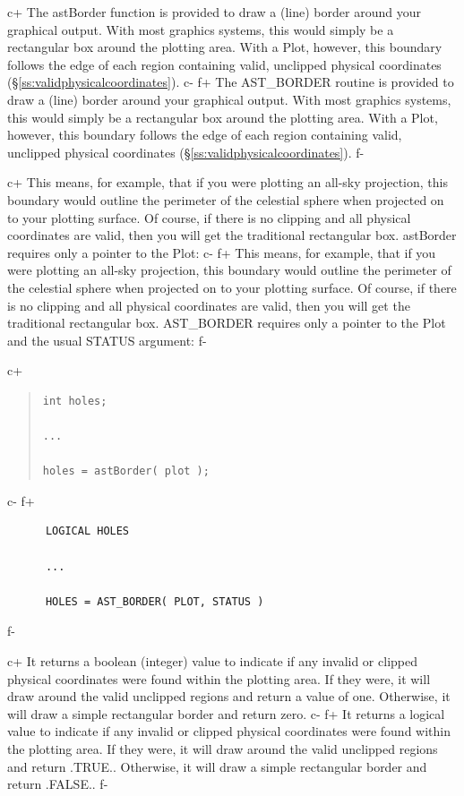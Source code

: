 \documentclass[twoside,11pt]{article}
\newcommand{\secref}[1]{\S\ref{#1}}
\newcommand{\secref}[1]{\ref{#1}}
\begin{document}
c+
The astBorder function is provided to draw a (line) border around your
graphical output. With most graphics systems, this would simply be a
rectangular box around the plotting area. With a Plot, however, this
boundary follows the edge of each region containing valid, unclipped
physical coordinates (\secref{ss:validphysicalcoordinates}).
c-
f+
The AST\_BORDER routine is provided to draw a (line) border around
your graphical output. With most graphics systems, this would simply
be a rectangular box around the plotting area. With a Plot, however,
this boundary follows the edge of each region containing valid,
unclipped physical coordinates (\secref{ss:validphysicalcoordinates}).
f-

c+
This means, for example, that if you were plotting an all-sky
projection, this boundary would outline the perimeter of the celestial
sphere when projected on to your plotting surface. Of course, if there
is no clipping and all physical coordinates are valid, then you will
get the traditional rectangular box. astBorder requires only
a pointer to the Plot:
c-
f+
This means, for example, that if you were plotting an all-sky
projection, this boundary would outline the perimeter of the celestial
sphere when projected on to your plotting surface. Of course, if there
is no clipping and all physical coordinates are valid, then you will
get the traditional rectangular box. AST\_BORDER requires only a
pointer to the Plot and the usual STATUS argument:
f-

c+
\begin{quote}
\small
\begin{verbatim}
int holes;

...

holes = astBorder( plot );
\end{verbatim}
\normalsize
\end{quote}
c-
f+
\small
\begin{verbatim}
      LOGICAL HOLES

      ...

      HOLES = AST_BORDER( PLOT, STATUS )
\end{verbatim}
\normalsize
f-

c+
It returns a boolean (integer) value to indicate if any invalid or
clipped physical coordinates were found within the plotting area. If
they were, it will draw around the valid unclipped regions and return
a value of one.  Otherwise, it will draw a simple rectangular border
and return zero.
c-
f+
It returns a logical value to indicate if any invalid or clipped
physical coordinates were found within the plotting area. If they
were, it will draw around the valid unclipped regions and return
.TRUE.. Otherwise, it will draw a simple rectangular border and return
.FALSE..
f-
\end{document}
